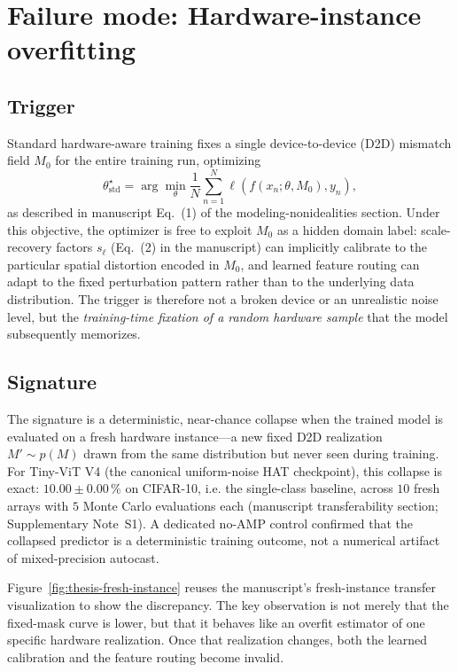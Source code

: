 \section{Failure mode: Hardware-instance overfitting}
\label{sec:failure-instance-overfitting}

\subsection{Trigger}

Standard hardware-aware training fixes a single device-to-device (D2D) mismatch field $M_{0}$ for the entire training run, optimizing
\begin{equation}
    \theta_{\mathrm{std}}^{\star}=\arg\min_{\theta}\frac{1}{N}\sum_{n=1}^{N}\ell\!\left(f(x_{n};\theta,M_{0}),y_{n}\right),
    \label{eq:hat-standard-repeat}
\end{equation}
as described in manuscript Eq.~(1) of the modeling-nonidealities section.  Under this objective, the optimizer is free to exploit $M_{0}$ as a hidden domain label: scale-recovery factors $s_{\ell}$ (Eq.~(2) in the manuscript) can implicitly calibrate to the particular spatial distortion encoded in $M_{0}$, and learned feature routing can adapt to the fixed perturbation pattern rather than to the underlying data distribution.  The trigger is therefore not a broken device or an unrealistic noise level, but the \emph{training-time fixation of a random hardware sample} that the model subsequently memorizes.

\subsection{Signature}

The signature is a deterministic, near-chance collapse when the trained model is evaluated on a fresh hardware instance---a new fixed D2D realization $M' \sim p(M)$ drawn from the same distribution but never seen during training.  For Tiny-ViT V4 (the canonical uniform-noise HAT checkpoint), this collapse is exact: $10.00\pm0.00\,\%$ on CIFAR-10, i.e. the single-class baseline, across $10$ fresh arrays with $5$ Monte Carlo evaluations each (manuscript transferability section; Supplementary Note~S1).  A dedicated no-AMP control confirmed that the collapsed predictor is a deterministic training outcome, not a numerical artifact of mixed-precision autocast.

Figure~\ref{fig:thesis-fresh-instance} reuses the manuscript's fresh-instance transfer visualization to show the discrepancy.  The key observation is not merely that the fixed-mask curve is lower, but that it behaves like an overfit estimator of one specific hardware realization.  Once that realization changes, both the learned calibration and the feature routing become invalid.

